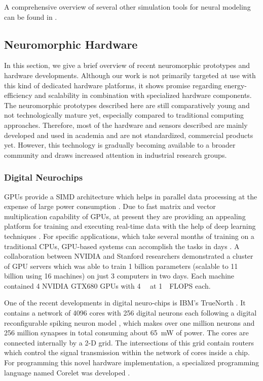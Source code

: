 A comprehensive overview of several other simulation tools for neural modeling can be found in \cite{Brette2007}.

\subsection{Neuromorphic Hardware}
\label{sec:neuromorphic_HW}

In this section, we give a brief overview of recent neuromorphic prototypes and hardware developments.
Although our work is not primarily targeted at use with this kind of dedicated hardware platforms, it shows promise regarding energy-efficiency and scalability in combination with specialized hardware components.
The neuromorphic prototypes described here are still comparatively young and not technologically mature yet, especially compared to traditional computing approaches.
Therefore, most of the hardware and sensors described are mainly developed and used in academia and are not standardized, commercial products yet.
However, this technology is gradually becoming available to a broader community and draws increased attention in industrial research groups.

\subsubsection{Digital Neurochips}
\acp{GPU} provide a \ac{SIMD} architecture which helps in parallel data processing at the expense of large power consumption \cite{Krichmar2011, Carlson2014}.
Due to fast matrix and vector multiplication capability of \acp{GPU}, at present they are providing an appealing platform for training and executing real-time data with the help of deep learning techniques \cite{Schmidhuber2015}.
For specific applications, which take several months of training on a traditional \acp{CPU}, \ac{GPU}-based systems can accomplish the tasks in days \cite{Edwards2015}.
A collaboration between NVIDIA and Stanford researchers demonstrated a cluster of \ac{GPU} servers which was able to train 1 billion parameters (scalable to 11 billion using 16 machines) on just 3 computers in two days.
Each machine contained 4 NVIDIA GTX680 \acp{GPU} with \SI{4}{\giga\byte} at \SI{1}{\tera\nothing}\ac{FLOPS} each.

One of the recent developments in digital neuro-chips is IBM's TrueNorth \cite{Akopyan2015}.
It contains a network of 4096 cores with 256 digital neurons each following a digital reconfigurable spiking neuron model \cite{Cassidy2013}, which makes over one million neurons and 256 million synapses in total consuming about \SI{65}{\milli\watt} of power.
The cores are connected internally by a 2-D grid.
The intersections of this grid contain routers which control the signal transmission within the network of cores inside a chip.
For programming this novel hardware implementation, a specialized programming language named Corelet was developed \cite{Amir2013}.


